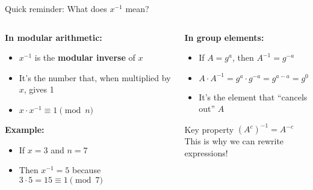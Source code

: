\documentclass[aspectratio=169, lualatex, handout]{beamer}
\begin{document}
\begin{frame}{Quick reminder: What does $x^{-1}$ mean?}
	\begin{columns}[c]
		\begin{column}{0.5\textwidth}
			\textbf{In modular arithmetic:}
			\begin{itemize}
				\item $x^{-1}$ is the \textbf{modular inverse} of $x$
				\item It's the number that, when multiplied by $x$, gives 1
				\item $x \cdot x^{-1} \equiv 1 \pmod{n}$
			\end{itemize}
			\vspace{0.5em}
			\textbf{Example:}
			\begin{itemize}
				\item If $x = 3$ and $n = 7$
				\item Then $x^{-1} = 5$ because $3 \cdot 5 = 15 \equiv 1 \pmod{7}$
			\end{itemize}
		\end{column}
		\begin{column}{0.5\textwidth}
			\textbf{In group elements:}
			\begin{itemize}
				\item If $A = g^a$, then $A^{-1} = g^{-a}$
				\item $A \cdot A^{-1} = g^a \cdot g^{-a} = g^{a-a} = g^0 = 1$
				\item It's the element that ``cancels out'' $A$
			\end{itemize}
			\vspace{0.5em}
			\begin{alertblock}{Key property}
				$(A^c)^{-1} = A^{-c}$ \\
				This is why we can rewrite expressions!
			\end{alertblock}
		\end{column}
	\end{columns}
\end{frame}
\end{document}
